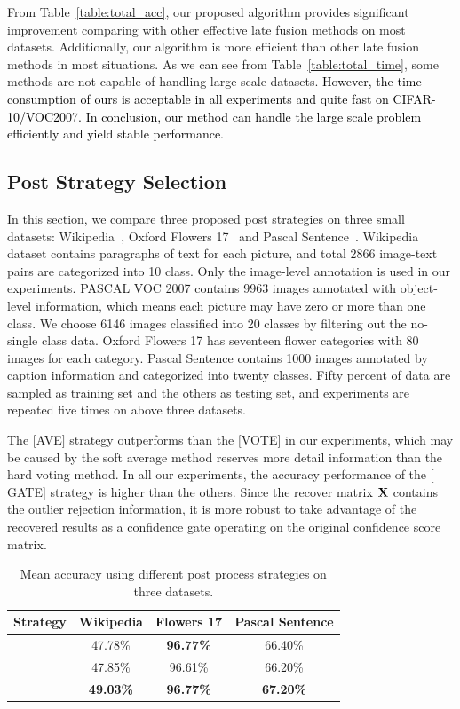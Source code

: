 \documentclass[10pt,twocolumn,letterpaper]{article}
\def\bX{{\bf X}}
\def\bX{{\bf X}}
\def\yanred{\textcolor{black}}
\begin{document}
From Table~\ref{table:total_acc}, our proposed algorithm provides significant improvement comparing with other effective late fusion methods on most datasets.
Additionally, our algorithm is more efficient than other late fusion methods in most situations.
As we can see from Table~\ref{table:total_time}, some methods are not capable of handling large scale datasets.
\yanred{
However, the time consumption of ours is acceptable in all experiments and quite fast on CIFAR-10/VOC2007.
In conclusion, our method can handle the large scale problem efficiently and yield stable performance.
}

\subsection{Post Strategy Selection}

In this section, we compare three proposed post strategies on three small datasets: Wikipedia~\cite{rasiwasia2010new}, Oxford Flowers 17~\cite{nilsback2006visual} and Pascal Sentence~\cite{Li2006One}.
Wikipedia dataset contains paragraphs of text for each picture, and total 2866 image-text pairs are categorized into 10 class.
Only the image-level annotation is used in our experiments.
PASCAL VOC 2007 contains 9963 images annotated with object-level information, which means each picture may have zero or more than one class.
We choose 6146 images classified into 20 classes by filtering out the no-single class data.
Oxford Flowers 17 has seventeen flower categories with 80 images for each category.
Pascal Sentence contains 1000 images annotated by caption information and categorized into twenty classes.
Fifty percent of data are sampled as training set and the others as testing set, and experiments are repeated five times on above three datasets.

The $[$AVE$]$ strategy outperforms than the $[$VOTE$]$ in our experiments, which may be caused by the soft average method reserves more detail information than the hard voting method.
In all our experiments, the accuracy performance of the $[$GATE$]$ strategy is higher than the others.
Since the recover matrix $\bX$ contains the outlier rejection information,
it is more robust to take advantage of the recovered results as a confidence gate operating on the original confidence score matrix.

\begin{table}[ht]
\centering
\begin{tabular}{|c|c|c|c|}
\hline
Strategy            & Wikipedia         & Flowers 17          & Pascal Sentence     \\\hline
[AVE]               & 47.78\%           & \textbf{96.77\%}    & 66.40\%             \\\hline
[VOTE]              & 47.85\%           & 96.61\%             & 66.20\%             \\\hline
[GATE]              & \textbf{49.03\%}  & \textbf{96.77\%}    & \textbf{67.20\%}    \\
\hline
\end{tabular}
\caption{Mean accuracy using different post process strategies on three datasets.}
\label{table:strategy}
\end{table}
\end{document}
